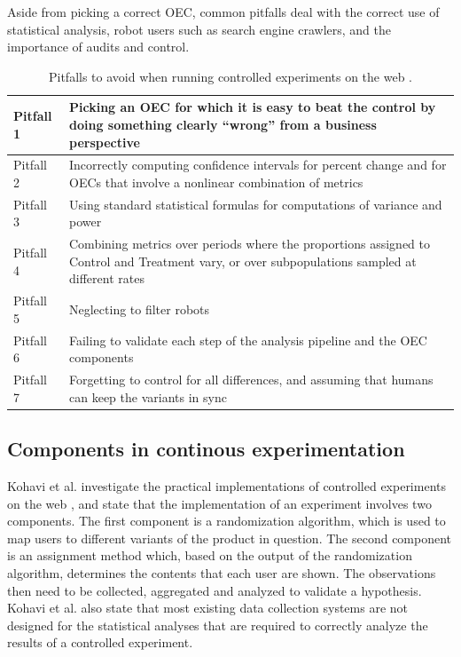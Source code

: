 \documentclass[conference]{IEEEtran}
\begin{document}
Aside from picking a correct OEC, common pitfalls deal with the correct use of statistical analysis, robot users such as search engine crawlers, and the importance of audits and control.
\begin{center}
\begin{table}[htb]
    \begin{tabular}{ | p{1cm} | p{6cm} |}
    \hline
	Pitfall 1 & Picking an OEC for which it is easy to beat the control by doing something clearly “wrong” from a business perspective \\ \hline
	Pitfall 2 & Incorrectly computing confidence intervals for percent change and for OECs that involve a nonlinear combination of metrics \\ \hline
	Pitfall 3 & Using standard statistical formulas for computations of variance and power \\ \hline
	Pitfall 4 & Combining metrics over periods where the proportions assigned to Control and Treatment vary, or over subpopulations sampled at different rates \\ \hline
	Pitfall 5 & Neglecting to filter robots \\ \hline
	Pitfall 6 & Failing to validate each step of the analysis pipeline and the OEC components \\ \hline
	Pitfall 7 & Forgetting to control for all differences, and assuming that humans can keep the variants in sync \\ \hline
    \end{tabular}
    \caption{Pitfalls to avoid when running controlled experiments on the web \cite{crook2009seven}.}
    \end{table}
\end{center}

\subsection{Components in continous experimentation}

Kohavi et al. investigate the practical implementations of controlled experiments on the web \cite{kohavi2007practical}, and state that the implementation of an experiment involves two components. The first component is a randomization algorithm, which is used to map users to different variants of the product in question. The second component is an assignment method which, based on the output of the randomization algorithm, determines the contents that each user are shown. The observations then need to be collected, aggregated and analyzed to validate a hypothesis. Kohavi et al. also state that most existing data collection systems are not designed for the statistical analyses that are required to correctly analyze the results of a controlled experiment.
\end{document}
